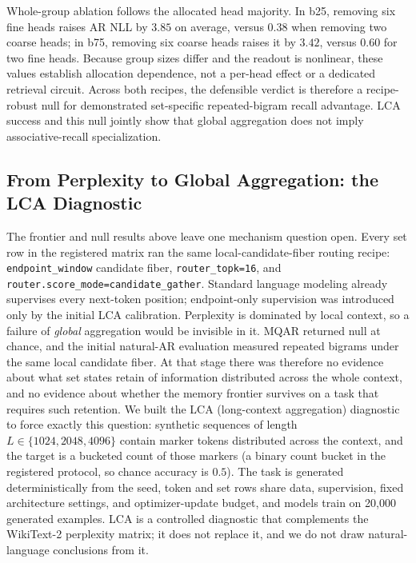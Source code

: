 \documentclass{article}
\theoremstyle{plain}
\theoremstyle{definition}
\theoremstyle{remark}
\begin{document}
Whole-group ablation follows the allocated head majority.  In b25, removing
six fine heads raises AR NLL by $3.85$ on average, versus $0.38$ when removing
two coarse heads; in b75, removing six coarse heads raises it by $3.42$, versus
$0.60$ for two fine heads.  Because group sizes differ and the readout is
nonlinear, these values establish allocation dependence, not a per-head effect
or a dedicated retrieval circuit.  Across both recipes, the defensible verdict
is therefore a recipe-robust null for demonstrated set-specific
repeated-bigram recall advantage.  LCA success and this null jointly show that
global aggregation does not imply associative-recall specialization.

\subsection{From Perplexity to Global Aggregation: the LCA Diagnostic}
\label{sec:results-lca-task}

The frontier and null results above leave one mechanism question open.  Every
set row in the registered matrix ran the same local-candidate-fiber routing
recipe:
\texttt{endpoint\_window} candidate fiber, \texttt{router\_topk=16},
and \texttt{router.score\_mode=candidate\_gather}.  Standard language modeling
already supervises every next-token position; endpoint-only supervision was
introduced only by the initial LCA calibration.  Perplexity is dominated by
local context, so a failure of \emph{global}
aggregation would be invisible in it.  MQAR returned null at chance, and the
initial natural-AR evaluation measured repeated bigrams under the same local
candidate fiber.  At that stage there was therefore no evidence about what set
states retain of information distributed across the whole context, and no
evidence about whether the memory frontier survives on a task that requires
such retention.  We built the LCA (long-context aggregation)
diagnostic to force exactly this question: synthetic sequences of length
$L\in\{1024,2048,4096\}$ contain marker tokens distributed across the context,
and the target is a bucketed count of those markers (a binary count bucket in
the registered protocol, so chance accuracy is $0.5$).  The task is
generated deterministically from the seed, token and set rows share data,
supervision, fixed architecture settings, and optimizer-update budget, and
models train on 20{,}000 generated examples.  LCA is a controlled diagnostic that complements the WikiText-2
perplexity matrix; it does not replace it, and we do not draw natural-language
conclusions from it.
\end{document}
